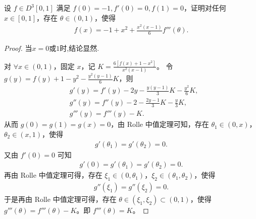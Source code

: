 \documentclass[../../main.tex]{subfiles}
\begin{document}
\begin{example}
设 $f \in D^3[0,1]$ 满足 $f(0) = -1, f'(0) = 0, f(1) = 0$，证明对任何 $x \in [0,1]$，存在 $\theta \in (0,1)$，使得
\begin{align*}
f(x) = -1 + x^2 + \frac{x^2 (x - 1)}{6} f'''(\theta).
\end{align*}
\end{example}
\begin{proof}
当$x=0$或$1$时,结论显然.

对 $\forall x\in (0,1)$，固定 $x$，记 $K=\frac{6[f(x) +1-x^2]}{x^2(x-1)}$。
令 $g(y) =f(y) +1-y^2-\frac{y^2(y-1)}{6}K$，则
\begin{align*}
&g'(y) =f'(y) -2y-\frac{y(y-1)}{3}K-\frac{y^2}{6}K, \\
&g''(y) =f''(y) -2-\frac{2y-1}{3}K-\frac{y}{3}K, \\
&g'''(y) =f'''(y) -K.
\end{align*}
从而 $g(0) =g(1) =g(x) =0$，由 Rolle 中值定理可知，存在 $\theta_1\in (0,x)$，$\theta_2\in (x,1)$，使得
\begin{align*}
g'(\theta_1) =g'(\theta_2) =0.
\end{align*}
又由 $f'(0) =0$ 可知
\begin{align*}
g'(0) =g'(\theta_1) =g'(\theta_2) =0.
\end{align*}
再由 Rolle 中值定理可得，存在 $\xi_1\in (0,\theta_1)$，$\xi_2\in (\theta_1,\theta_2)$，使得
\begin{align*}
g''(\xi_1) =g''(\xi_2) =0.
\end{align*}
于是再由 Rolle 中值定理可得，存在 $\theta \in (\xi_1,\xi_2) \subset (0,1)$，使得 $g'''(\theta) =f'''(\theta) -K$。即 $f'''(\theta) =K$。

\end{proof}
\end{document}
